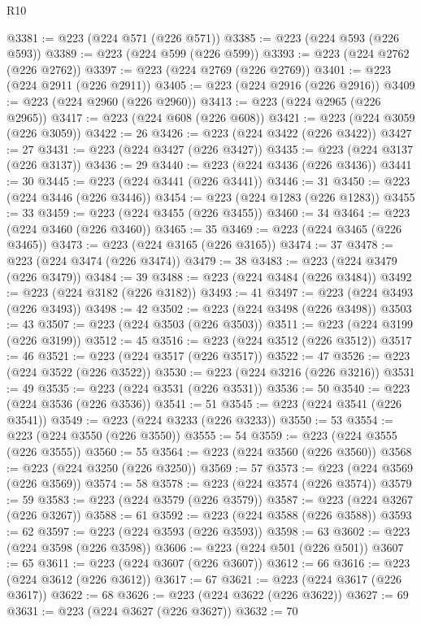 \begin{lexlean}{R10}
\begin{coremodule}
@3381 := @223 (@224 @571 (@226 @571))
@3385 := @223 (@224 @593 (@226 @593))
@3389 := @223 (@224 @599 (@226 @599))
@3393 := @223 (@224 @2762 (@226 @2762))
@3397 := @223 (@224 @2769 (@226 @2769))
@3401 := @223 (@224 @2911 (@226 @2911))
@3405 := @223 (@224 @2916 (@226 @2916))
@3409 := @223 (@224 @2960 (@226 @2960))
@3413 := @223 (@224 @2965 (@226 @2965))
@3417 := @223 (@224 @608 (@226 @608))
@3421 := @223 (@224 @3059 (@226 @3059))
@3422 := 26
@3426 := @223 (@224 @3422 (@226 @3422))
@3427 := 27
@3431 := @223 (@224 @3427 (@226 @3427))
@3435 := @223 (@224 @3137 (@226 @3137))
@3436 := 29
@3440 := @223 (@224 @3436 (@226 @3436))
@3441 := 30
@3445 := @223 (@224 @3441 (@226 @3441))
@3446 := 31
@3450 := @223 (@224 @3446 (@226 @3446))
@3454 := @223 (@224 @1283 (@226 @1283))
@3455 := 33
@3459 := @223 (@224 @3455 (@226 @3455))
@3460 := 34
@3464 := @223 (@224 @3460 (@226 @3460))
@3465 := 35
@3469 := @223 (@224 @3465 (@226 @3465))
@3473 := @223 (@224 @3165 (@226 @3165))
@3474 := 37
@3478 := @223 (@224 @3474 (@226 @3474))
@3479 := 38
@3483 := @223 (@224 @3479 (@226 @3479))
@3484 := 39
@3488 := @223 (@224 @3484 (@226 @3484))
@3492 := @223 (@224 @3182 (@226 @3182))
@3493 := 41
@3497 := @223 (@224 @3493 (@226 @3493))
@3498 := 42
@3502 := @223 (@224 @3498 (@226 @3498))
@3503 := 43
@3507 := @223 (@224 @3503 (@226 @3503))
@3511 := @223 (@224 @3199 (@226 @3199))
@3512 := 45
@3516 := @223 (@224 @3512 (@226 @3512))
@3517 := 46
@3521 := @223 (@224 @3517 (@226 @3517))
@3522 := 47
@3526 := @223 (@224 @3522 (@226 @3522))
@3530 := @223 (@224 @3216 (@226 @3216))
@3531 := 49
@3535 := @223 (@224 @3531 (@226 @3531))
@3536 := 50
@3540 := @223 (@224 @3536 (@226 @3536))
@3541 := 51
@3545 := @223 (@224 @3541 (@226 @3541))
@3549 := @223 (@224 @3233 (@226 @3233))
@3550 := 53
@3554 := @223 (@224 @3550 (@226 @3550))
@3555 := 54
@3559 := @223 (@224 @3555 (@226 @3555))
@3560 := 55
@3564 := @223 (@224 @3560 (@226 @3560))
@3568 := @223 (@224 @3250 (@226 @3250))
@3569 := 57
@3573 := @223 (@224 @3569 (@226 @3569))
@3574 := 58
@3578 := @223 (@224 @3574 (@226 @3574))
@3579 := 59
@3583 := @223 (@224 @3579 (@226 @3579))
@3587 := @223 (@224 @3267 (@226 @3267))
@3588 := 61
@3592 := @223 (@224 @3588 (@226 @3588))
@3593 := 62
@3597 := @223 (@224 @3593 (@226 @3593))
@3598 := 63
@3602 := @223 (@224 @3598 (@226 @3598))
@3606 := @223 (@224 @501 (@226 @501))
@3607 := 65
@3611 := @223 (@224 @3607 (@226 @3607))
@3612 := 66
@3616 := @223 (@224 @3612 (@226 @3612))
@3617 := 67
@3621 := @223 (@224 @3617 (@226 @3617))
@3622 := 68
@3626 := @223 (@224 @3622 (@226 @3622))
@3627 := 69
@3631 := @223 (@224 @3627 (@226 @3627))
@3632 := 70

\end{coremodule}
\end{lexlean}
